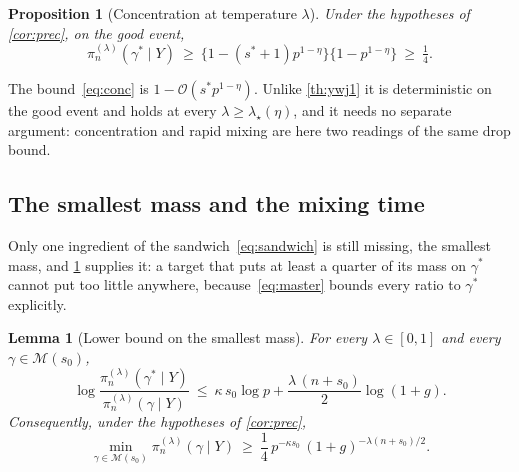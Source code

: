 \documentclass[aos]{imsart}
\theoremstyle{plain}
\newtheorem{proposition}{Proposition}[section]
\newtheorem{lemma}{Lemma}[section]
\theoremstyle{definition}
\begin{document}
    \begin{proposition}[Concentration at temperature $\lambda$]
        \label{prop:conc}
        Under the hypotheses of \cref{cor:prec}, on the good event,
        \begin{equation}
            \label{eq:conc}
            \pi_n^{(\lambda)}(\gamma^{\ast}\mid Y)
            \ \geq\ \bigl\{1-(s^{\ast}+1)p^{1-\eta}\bigr\}
            \bigl\{1-p^{1-\eta}\bigr\}\ \geq\ \tfrac14 .
        \end{equation}
    \end{proposition}


    The bound~\eqref{eq:conc} is $1-\mathcal{O}(s^{\ast}p^{1-\eta})$. Unlike
    \cref{th:ywj1} it is deterministic
    on the good event and holds at every $\lambda\geq\lambda_\star(\eta)$,
    and it needs no separate argument: concentration and rapid mixing are
    here two readings of the same drop bound.

    \subsection{The smallest mass and the mixing time}
    \label{sub:tau}

    Only one ingredient of the sandwich~\eqref{eq:sandwich} is still
    missing, the smallest mass, and \cref{prop:conc} supplies it: a target
    that puts at least a quarter of its mass on $\gamma^{\ast}$ cannot put
    too little anywhere, because~\eqref{eq:master} bounds every ratio to
    $\gamma^{\ast}$ explicitly.

    \begin{lemma}[Lower bound on the smallest mass]
        \label{lemma:minmass}
        For every $\lambda\in[0,1]$ and every $\gamma\in\mathscr{M}(s_0)$,
        \begin{equation}
            \label{eq:minmass}
            \log\frac{\pi_n^{(\lambda)}(\gamma^{\ast}\mid Y)}
            {\pi_n^{(\lambda)}(\gamma\mid Y)}
            \ \leq\ \kappa\,s_0\log p
            +\frac{\lambda\,(n+s_0)}{2}\log(1+g) .
        \end{equation}
        Consequently, under the hypotheses of \cref{cor:prec},
        \begin{equation}
            \label{eq:minmass2}
            \min_{\gamma\in\mathscr{M}(s_0)}
            \pi_n^{(\lambda)}(\gamma\mid Y)
            \ \geq\ \frac14\,p^{-\kappa s_0}\,
            (1+g)^{-\lambda(n+s_0)/2} .
        \end{equation}
    \end{lemma}
\end{document}
